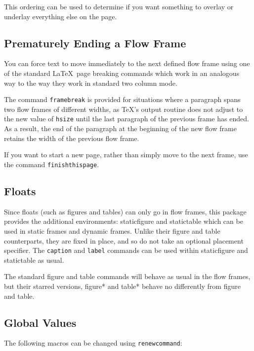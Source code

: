 \documentclass[a0]{a0poster}
\newcommand{\env}[1]{\textsf{#1}}
\newcommand{\cmdname}[1]{\texttt{\symbol{92}#1}}
\begin{document}
This ordering can be used to determine if you want something
to overlay or underlay everything else on the page. 

\subsection{Prematurely Ending a Flow Frame}

You can force text to move immediately to the next defined
flow frame using one of the standard \LaTeX\ page breaking commands
which  work in an analogous way to the way they
work in standard two column mode. 

The command \cmdname{framebreak} is provided for situations
where a paragraph spans two flow frames
of different widths, as \TeX's output routine does not 
adjust to the new value of \cmdname{hsize} until the last 
paragraph of the previous frame has ended. As a 
result, the end of the paragraph at the beginning of the new
flow frame retains the width of the previous flow frame.

If you want to start a new page, rather than simply move to the 
next frame, use the command\newline
\cmdname{finishthispage}.

\subsection{Floats}

Since floats (such as figures and tables) can only go in 
{flow frames}, this package provides
the additional environments: 
\env{staticfigure} and  
\env{statictable} which can be used in static frames
and dynamic frames. Unlike their \env{figure} and
\env{table} counterparts, they are fixed in place, and
so do not take an optional placement specifier. The 
\cmdname{caption} and \cmdname{label} commands can 
be used within \env{staticfigure} and \env{statictable} as
usual.

The standard \env{figure} and \env{table} commands will 
behave as usual in the flow frames, but their starred versions,
\env{figure*} and \env{table*} behave no differently
from \env{figure} and \env{table}.

\subsection{Global Values}

The following macros can be changed using \cmdname{renewcommand}:
\end{document}
